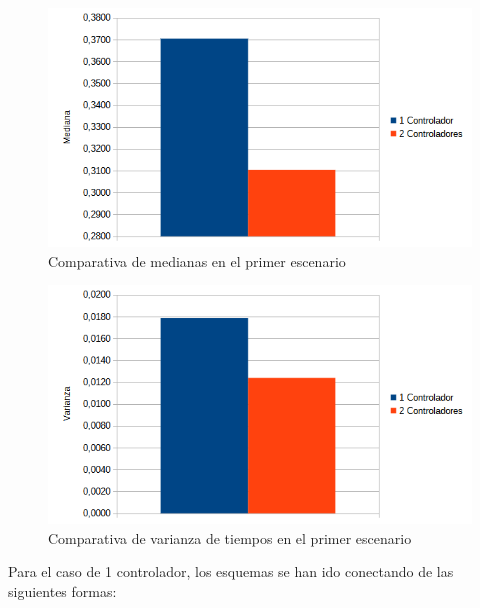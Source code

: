 \documentclass[a4paper, 12pt]{book}
\begin{document}
 	\begin{figure}[H]
 		\centering
 		\includegraphics[width=12cm, keepaspectratio]{img/comparativamedianabucle}
 		\caption{Comparativa de medianas en el primer escenario}
 		\label{figura:medianabucle4}
 	\end{figure}
 	
 	\begin{figure}[H]
 		\centering
 		\includegraphics[width=12cm, keepaspectratio]{img/comparativavarianzabucle}
 		\caption{Comparativa de varianza de tiempos en el primer escenario}
 		\label{figura:varianzabucle4}
 	\end{figure}
 	
 	Para el caso de 1 controlador, los esquemas se han ido conectando de las siguientes formas:
 	
\end{document}
